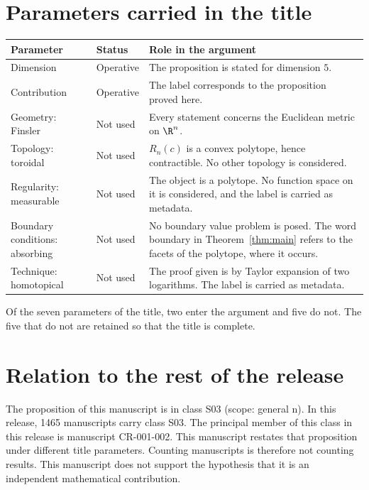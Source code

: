 \documentclass[11pt]{article}
\begin{document}
\section{Parameters carried in the title}\label{sec:params}
\begin{center}
\small
\begin{tabular}{p{}p{}p{}}
\toprule
Parameter & Status & Role in the argument \\
\midrule
Dimension & Operative & The proposition is stated for dimension $5$. \\
Contribution & Operative & The label corresponds to the proposition proved here. \\
Geometry: Finsler & Not used & Every statement concerns the Euclidean metric on $\R^n$. \\
Topology: toroidal & Not used & $R_n(c)$ is a convex polytope, hence contractible. No other topology is considered. \\
Regularity: measurable & Not used & The object is a polytope. No function space on it is considered, and the label is carried as metadata. \\
Boundary conditions: absorbing & Not used & No boundary value problem is posed. The word boundary in Theorem~\ref{thm:main} refers to the facets of the polytope, where it occurs. \\
Technique: homotopical & Not used & The proof given is by Taylor expansion of two logarithms. The label is carried as metadata. \\
\bottomrule
\end{tabular}
\end{center}
Of the seven parameters of the title, two enter the argument and five do not. The five that do not are retained so that the title is complete.

\section{Relation to the rest of the release}
The proposition of this manuscript is in class S03 (scope: general n).
In this release, 1465 manuscripts carry class S03. The principal member of this class in this release is manuscript CR-001-002. This manuscript restates that proposition under different title parameters.
Counting manuscripts is therefore not counting results. This manuscript does not support the hypothesis that it is an independent mathematical contribution.
\end{document}
